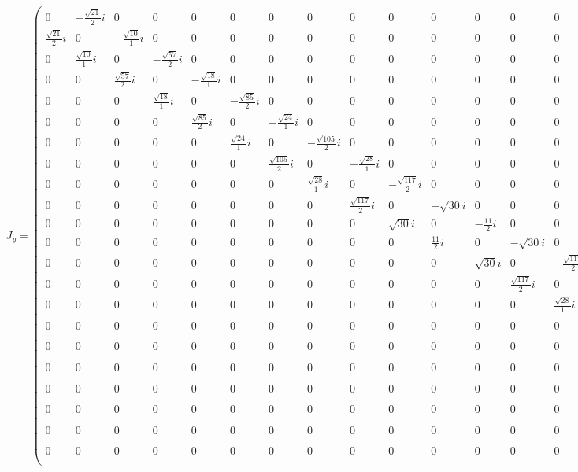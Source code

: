 \documentclass[10pt,a4paper]{article}
\begin{document}
\begin{align}
J_y = \begin{pmatrix}
0&-\frac{\sqrt{21}}{2}i&0&0&0&0&0&0&0&0&0&0&0&0&0&0&0&0&0&0&0&0&\\\frac{\sqrt{21}}{2}i&0&-\frac{\sqrt{10}}{1}i&0&0&0&0&0&0&0&0&0&0&0&0&0&0&0&0&0&0&0&\\0&\frac{\sqrt{10}}{1}i&0&-\frac{\sqrt{57}}{2}i&0&0&0&0&0&0&0&0&0&0&0&0&0&0&0&0&0&0&\\0&0&\frac{\sqrt{57}}{2}i&0&-\frac{\sqrt{18}}{1}i&0&0&0&0&0&0&0&0&0&0&0&0&0&0&0&0&0&\\0&0&0&\frac{\sqrt{18}}{1}i&0&-\frac{\sqrt{85}}{2}i&0&0&0&0&0&0&0&0&0&0&0&0&0&0&0&0&\\0&0&0&0&\frac{\sqrt{85}}{2}i&0&-\frac{\sqrt{24}}{1}i&0&0&0&0&0&0&0&0&0&0&0&0&0&0&0&\\0&0&0&0&0&\frac{\sqrt{24}}{1}i&0&-\frac{\sqrt{105}}{2}i&0&0&0&0&0&0&0&0&0&0&0&0&0&0&\\0&0&0&0&0&0&\frac{\sqrt{105}}{2}i&0&-\frac{\sqrt{28}}{1}i&0&0&0&0&0&0&0&0&0&0&0&0&0&\\0&0&0&0&0&0&0&\frac{\sqrt{28}}{1}i&0&-\frac{\sqrt{117}}{2}i&0&0&0&0&0&0&0&0&0&0&0&0&\\0&0&0&0&0&0&0&0&\frac{\sqrt{117}}{2}i&0&-\sqrt{30}i&0&0&0&0&0&0&0&0&0&0&0&\\0&0&0&0&0&0&0&0&0&\sqrt{30}i&0&-\frac{11}{2}i&0&0&0&0&0&0&0&0&0&0&\\0&0&0&0&0&0&0&0&0&0&\frac{11}{2}i&0&-\sqrt{30}i&0&0&0&0&0&0&0&0&0&\\0&0&0&0&0&0&0&0&0&0&0&\sqrt{30}i&0&-\frac{\sqrt{117}}{2}i&0&0&0&0&0&0&0&0&\\0&0&0&0&0&0&0&0&0&0&0&0&\frac{\sqrt{117}}{2}i&0&-\frac{\sqrt{28}}{1}i&0&0&0&0&0&0&0&\\0&0&0&0&0&0&0&0&0&0&0&0&0&\frac{\sqrt{28}}{1}i&0&-\frac{\sqrt{105}}{2}i&0&0&0&0&0&0&\\0&0&0&0&0&0&0&0&0&0&0&0&0&0&\frac{\sqrt{105}}{2}i&0&-\frac{\sqrt{24}}{1}i&0&0&0&0&0&\\0&0&0&0&0&0&0&0&0&0&0&0&0&0&0&\frac{\sqrt{24}}{1}i&0&-\frac{\sqrt{85}}{2}i&0&0&0&0&\\0&0&0&0&0&0&0&0&0&0&0&0&0&0&0&0&\frac{\sqrt{85}}{2}i&0&-\frac{\sqrt{18}}{1}i&0&0&0&\\0&0&0&0&0&0&0&0&0&0&0&0&0&0&0&0&0&\frac{\sqrt{18}}{1}i&0&-\frac{\sqrt{57}}{2}i&0&0&\\0&0&0&0&0&0&0&0&0&0&0&0&0&0&0&0&0&0&\frac{\sqrt{57}}{2}i&0&-\frac{\sqrt{10}}{1}i&0&\\0&0&0&0&0&0&0&0&0&0&0&0&0&0&0&0&0&0&0&\frac{\sqrt{10}}{1}i&0&-\frac{\sqrt{21}}{2}i&\\0&0&0&0&0&0&0&0&0&0&0&0&0&0&0&0&0&0&0&0&\frac{\sqrt{21}}{2}i&0&\\\end{pmatrix}\end{align}
\end{document}
